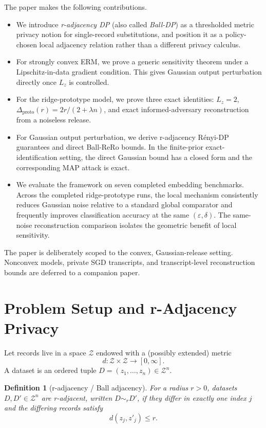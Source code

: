 \documentclass[conference,compsoc]{IEEEtran}
\newtheorem{definition}{Definition}
\begin{document}
The paper makes the following contributions.
\begin{itemize}[leftmargin=1.5em]
    \item We introduce \emph{r-adjacency DP} (also called \emph{Ball-DP}) as a thresholded metric privacy notion for single-record substitutions, and position it as a policy-chosen local adjacency relation rather than a different privacy calculus.
    \item For strongly convex ERM, we prove a generic sensitivity theorem under a Lipschitz-in-data gradient condition. This gives Gaussian output perturbation directly once $L_z$ is controlled.
    \item For the ridge-prototype model, we prove three exact identities: $L_z=2$, $\Delta_{\mathrm{proto}}(r)=2r/(2+\lambda n)$, and exact informed-adversary reconstruction from a noiseless release.
    \item For Gaussian output perturbation, we derive r-adjacency Rényi-DP guarantees and direct Ball-ReRo bounds. In the finite-prior exact-identification setting, the direct Gaussian bound has a closed form and the corresponding MAP attack is exact.
    \item We evaluate the framework on seven completed embedding benchmarks. Across the completed ridge-prototype runs, the local mechanism consistently reduces Gaussian noise relative to a standard global comparator and frequently improves classification accuracy at the same $(\varepsilon,\delta)$. The same-noise reconstruction comparison isolates the geometric benefit of local sensitivity.
\end{itemize}

The paper is deliberately scoped to the convex, Gaussian-release setting. Nonconvex models, private SGD transcripts, and transcript-level reconstruction bounds are deferred to a companion paper.

\section{Problem Setup and r-Adjacency Privacy}
\label{sec:setup}

Let records live in a space $\mathcal{Z}$ endowed with a (possibly extended) metric
\[
d:\mathcal{Z}\times\mathcal{Z}\to[0,\infty].
\]
A dataset is an ordered tuple $D=(z_1,\dots,z_n)\in\mathcal{Z}^n$.

\begin{definition}[r-adjacency / Ball adjacency]
For a radius $r>0$, datasets $D,D'\in\mathcal{Z}^n$ are \emph{r-adjacent}, written $D\sim_r D'$, if they differ in exactly one index $j$ and the differing records satisfy
\[
d(z_j,z'_j)\le r.
\]
\end{definition}
\end{document}
